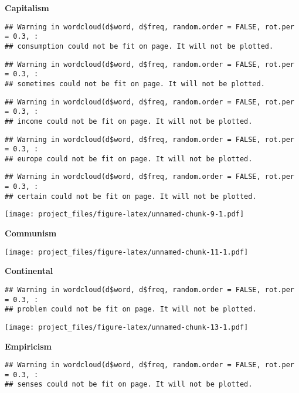 \documentclass[
]{article}
\begin{document}
\textbf{Capitalism}

\begin{verbatim}
## Warning in wordcloud(d$word, d$freq, random.order = FALSE, rot.per = 0.3, :
## consumption could not be fit on page. It will not be plotted.
\end{verbatim}

\begin{verbatim}
## Warning in wordcloud(d$word, d$freq, random.order = FALSE, rot.per = 0.3, :
## sometimes could not be fit on page. It will not be plotted.
\end{verbatim}

\begin{verbatim}
## Warning in wordcloud(d$word, d$freq, random.order = FALSE, rot.per = 0.3, :
## income could not be fit on page. It will not be plotted.
\end{verbatim}

\begin{verbatim}
## Warning in wordcloud(d$word, d$freq, random.order = FALSE, rot.per = 0.3, :
## europe could not be fit on page. It will not be plotted.
\end{verbatim}

\begin{verbatim}
## Warning in wordcloud(d$word, d$freq, random.order = FALSE, rot.per = 0.3, :
## certain could not be fit on page. It will not be plotted.
\end{verbatim}

\texttt{[image: project\_files/figure-latex/unnamed-chunk-9-1.pdf]}

\textbf{Communism}

\texttt{[image: project\_files/figure-latex/unnamed-chunk-11-1.pdf]}

\textbf{Continental}

\begin{verbatim}
## Warning in wordcloud(d$word, d$freq, random.order = FALSE, rot.per = 0.3, :
## problem could not be fit on page. It will not be plotted.
\end{verbatim}

\texttt{[image: project\_files/figure-latex/unnamed-chunk-13-1.pdf]}

\textbf{Empiricism}

\begin{verbatim}
## Warning in wordcloud(d$word, d$freq, random.order = FALSE, rot.per = 0.3, :
## senses could not be fit on page. It will not be plotted.
\end{verbatim}
\end{document}
